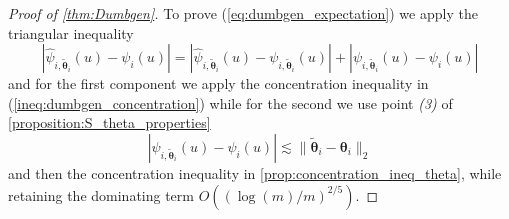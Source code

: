 \documentclass{article} %
\def\eqref#1{equation~\ref{#1}}
\renewcommand{\eqref}[1]{(\ref{#1})}
\begin{document}
\begin{proof}[Proof of \cref{thm:Dumbgen}]
To prove \eqref{eq:dumbgen_expectation} we apply the triangular inequality 
$$
|\widehat \psi_{i,\widetilde{\boldsymbol{\theta}}_i}(u)-\psi_{i}(u)| = |\widehat \psi_{i,\widetilde{\boldsymbol{\theta}}_i}(u)-\psi_{i,\widetilde{\boldsymbol{\theta}}_i}(u)|+ | \psi_{i,\widetilde{\boldsymbol{\theta}}_i}(u)-\psi_{i}(u)|
$$
and for the first component we apply the concentration inequality in \eqref{ineq:dumbgen_concentration} while for the second we use point \textit{(3)} of \cref{proposition:S_theta_properties}
$$
|\psi_{i,\widetilde{\boldsymbol{\theta}}_i}(u)-\psi_{i}(u)| \lesssim \| \widetilde{\boldsymbol{\theta}}_i-\boldsymbol{\theta}_i\|_2
$$
and then the concentration inequality in \cref{prop:concentration_ineq_theta}, while retaining the dominating term $O((\log(m)/m)^{2/5})$.
\end{proof}

\newpage
\end{document}
